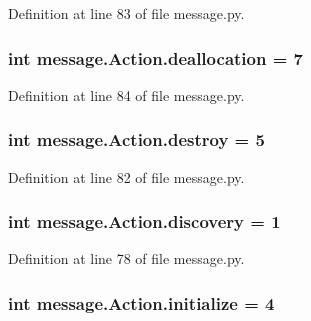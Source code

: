 Definition at line 83 of file message.\+py.

\hypertarget{classmessage_1_1Action_ab9cff1fcf22674639a1bd8f7d59faa98}{}
\subsubsection[{deallocation}]{\setlength{\rightskip}{0pt plus 5cm}int message.\+Action.\+deallocation = 7\hspace{0.3cm}{\ttfamily [static]}}\label{classmessage_1_1Action_ab9cff1fcf22674639a1bd8f7d59faa98}


Definition at line 84 of file message.\+py.

\hypertarget{classmessage_1_1Action_aadd1f9f6370743bfafe956c4522440db}{}
\subsubsection[{destroy}]{\setlength{\rightskip}{0pt plus 5cm}int message.\+Action.\+destroy = 5\hspace{0.3cm}{\ttfamily [static]}}\label{classmessage_1_1Action_aadd1f9f6370743bfafe956c4522440db}


Definition at line 82 of file message.\+py.

\hypertarget{classmessage_1_1Action_ad5e8b0817a65cbd69a740a63d4fb605f}{}
\subsubsection[{discovery}]{\setlength{\rightskip}{0pt plus 5cm}int message.\+Action.\+discovery = 1\hspace{0.3cm}{\ttfamily [static]}}\label{classmessage_1_1Action_ad5e8b0817a65cbd69a740a63d4fb605f}


Definition at line 78 of file message.\+py.

\hypertarget{classmessage_1_1Action_a765e205abc0e8ab807e5ddedb5f3ef17}{}
\subsubsection[{initialize}]{\setlength{\rightskip}{0pt plus 5cm}int message.\+Action.\+initialize = 4\hspace{0.3cm}{\ttfamily [static]}}\label{classmessage_1_1Action_a765e205abc0e8ab807e5ddedb5f3ef17}


